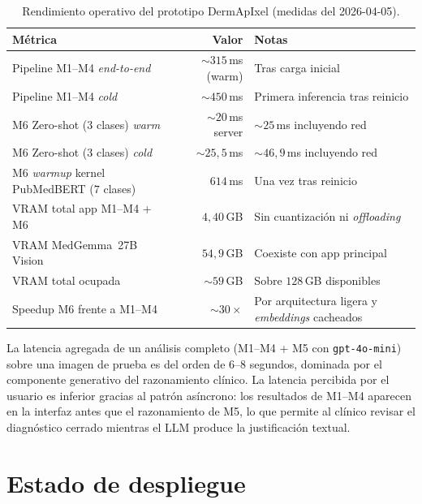 \begin{table}[H]
\centering
\footnotesize
\setlength{\tabcolsep}{4pt}
\renewcommand{\arraystretch}{0.95}
\caption{Rendimiento operativo del prototipo DermApIxel (medidas
del 2026-04-05).}
\label{tab:dermapixel-rendimiento}
\begin{tabular}{lrl}
\hline
Métrica                                          & Valor               & Notas \\
\hline
Pipeline M1--M4 \emph{end-to-end}                 & $\sim 315$\,ms (warm) & Tras carga inicial \\
Pipeline M1--M4 \emph{cold}                       & $\sim 450$\,ms        & Primera inferencia tras reinicio \\
M6 Zero-shot ($3$ clases) \emph{warm}             & $\sim 20$\,ms server  & $\sim 25$\,ms incluyendo red \\
M6 Zero-shot ($3$ clases) \emph{cold}             & $\sim 25{,}5$\,ms     & $\sim 46{,}9$\,ms incluyendo red \\
M6 \emph{warmup} kernel PubMedBERT ($7$ clases)   & $614$\,ms             & Una vez tras reinicio \\
VRAM total app M1--M4 + M6                        & $4{,}40$\,GB         & Sin cuantización ni \emph{offloading} \\
VRAM MedGemma~27B Vision                          & $54{,}9$\,GB         & Coexiste con app principal \\
VRAM total ocupada                                & $\sim 59$\,GB        & Sobre $128$\,GB disponibles \\
Speedup M6 frente a M1--M4                        & $\sim 30\times$       & Por arquitectura ligera y \emph{embeddings} cacheados \\
\hline
\end{tabular}
\end{table}

La latencia agregada de un análisis completo
(M1--M4 + M5 con \texttt{gpt-4o-mini}) sobre una imagen de
prueba es del orden de $6$--$8$ segundos, dominada por el
componente generativo del razonamiento clínico. La latencia
percibida por el usuario es inferior gracias al patrón asíncrono:
los resultados de M1--M4 aparecen en la interfaz antes que el
razonamiento de M5, lo que permite al clínico revisar el
diagnóstico cerrado mientras el LLM produce la justificación
textual.

\section{Estado de despliegue}
\label{sec:dermapixel-estado}

